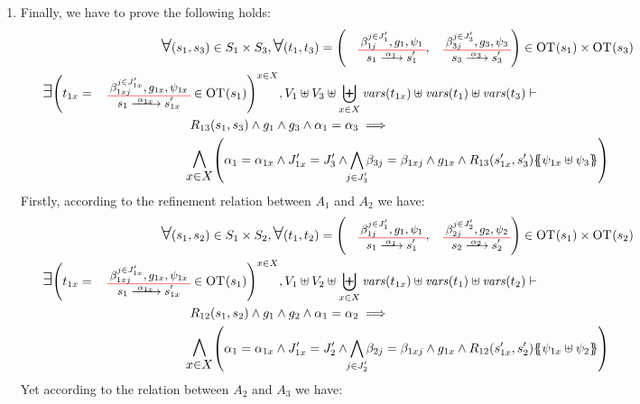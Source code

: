 \documentclass[runningheads]{llncs}
\begin{document}
\begin{enumerate}
\item  Finally, we have to prove the following holds:
\begin{multline*}
\bigforall \mpar{s_1, s_3} \in S_1 \times S_3, \bigsymb{\forall} \mpar{t_1, t_3} = \mpar{\OTx{1}{}{1}{1}, \OTx{3}{}{3}{3}} \in \fOT{s_1} \times \fOT{s_3} \\ 
\bigsymb{\bigexists} 
\mpar{t_{1x} = \OTx{1}{x}{1x}{1x} \in \fOT{s_1}}^{x \in X},
 V_1 \uplus V_3\uplus \biguplus_{x\in X}\fvars{t_{1x}} \uplus \fvars{t_1} \uplus \fvars{t_3} \vdash \hspace{6cm}\\  R_{13}\mpar{s_1, s_3} \wedge 	g_1 \wedge g_3 \wedge \alpha_1 = \alpha_3 
\implies \hspace{6cm}\\
\bigsymb{\bigwedge_{x\in X}}
\mpar{
\alpha_1=\alpha_{1 x}  \land J'_{1x}= J'_3 \land \bigwedge_\subbox{j \in J'_3 } \beta_{3j} = \beta_{1xj}\land g_{1 x}\land
 R_{13}\mpar{s'_{1 x}, s'_3}\psubst{\psi_{1 x} \uplus \psi_3}}
\end{multline*}
Firstly, according to the refinement relation between  $A_1$ and $A_2$ we have:
\begin{multline*}
\bigforall \mpar{s_1, s_2} \in S_1 \times S_2, \bigsymb{\forall} \mpar{t_1, t_2} = \mpar{\OTx{1}{}{1}{1}, \OTx{2}{}{2}{2}} \in \fOT{s_1} \times \fOT{s_2} \\ 
\bigsymb{\bigexists} 
\mpar{t_{1x} = \OTx{1}{x}{1x}{1x} \in \fOT{s_1}}^{x \in X},
 V_1 \uplus V_2 \uplus \biguplus_{x\in X}\fvars{t_{1x}} \uplus \fvars{t_1} \uplus \fvars{t_2} \vdash \hspace{6cm}\\  R_{12}\mpar{s_1, s_2} \wedge 	g_1 \wedge g_2 \wedge \alpha_1 = \alpha_2 
\implies \hspace{6cm}\\
\bigsymb{\bigwedge_{x\in X}}
\mpar{
\alpha_1=\alpha_{1 x}  \land J'_{1x}= J'_2 \land \bigwedge_\subbox{j \in J'_2 } \beta_{2j} = \beta_{1xj}\land g_{1 x}\land
 R_{12}\mpar{s'_{1 x}, s'_2}\psubst{\psi_{1 x} \uplus \psi_2}}
\end{multline*}
Yet according to the relation between   $A_2$ and $A_3$ we have:


\end{enumerate}
\end{document}
